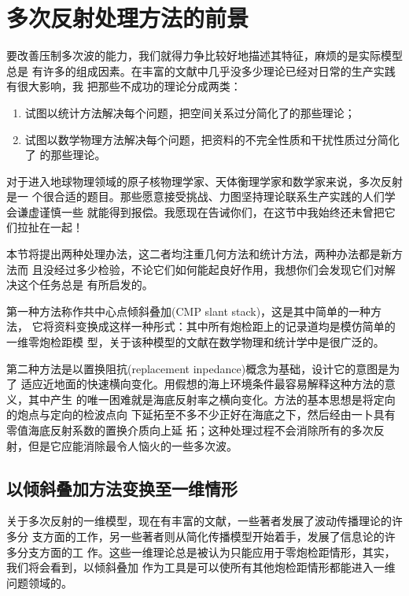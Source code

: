 \section{多次反射处理方法的前景}
\label{sec:5.6}

要改善压制多次波的能力，我们就得力争比较好地描述其特征，麻烦的是实际模型总是
有许多的组成因素。在丰富的文献中几乎没多少理论已经对日常的生产实践有很大影响，我
把那些不成功的理论分成两类：
\begin{enumerate}
\item 试图以统计方法解决每个问题，把空间关系过分简化了的那些理论；
\item 试图以数学物理方法解决每个问题，把资料的不完全性质和干扰性质过分简化了
的那些理论。
\end{enumerate}

对于进入地球物理领域的原子核物理学家、天体衡理学家和数学家来说，多次反射是一
个很合适的题目。那些愿意接受挑战、力图坚持理论联系生产实践的人们学会谦虚谨慎一些
就能得到报偿。我愿现在告诫你们，在这节中我始终还未曾把它们拉扯在一起！

本节将提出两种处理办法，这二者均注重几何方法和统计方法，两种办法都是新方法而
且没经过多少检验，不论它们如何能起良好作用，我想你们会发现它们对解决这个任务总是
有所启发的。

第一种方法称作共中心点倾斜叠加(CMP slant stack)，这是其中简单的一种方法，
它将资料变换成这样一种彤式：其中所有炮检距上的记录道均是模仿简单的一维零炮检距模
型，关于该种模型的文献在数学物理和统计学中是很广泛的。

第二种方法是以置换阻抗(replacement inpedance)概念为基础，设计它的意图是为了
适应近地面的快速横向变化。用假想的海上环境条件最容易解释这种方法的意义，其中产生
的唯一困难就是海底反射率之横向变化。方法的基本思想是将定向的炮点与定向的检波点向
下延拓至不多不少正好在海底之下，然后经由一卜具有零值海底反射系数的置换介质向上延
拓；这种处理过程不会消除所有的多次反射，但是它应能消除最令人恼火的一些多次波。

\subsection{以倾斜叠加方法变换至一维情形}
\label{sec:5.6.1}

关于多次反射的一维模型，现在有丰富的文献，一些著者发展了波动传播理论的许多分
支方面的工作，另一些著者则从简化传播模型开始着手，发展了信息论的许多分支方面的工
作。这些一维理论总是被认为只能应用于零炮检距情形，其实，我们将会看到，以倾斜叠加
作为工具是可以使所有其他炮检距情形都能进入一维问题领域的。



